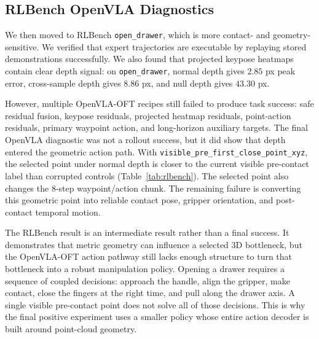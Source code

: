 \documentclass[conference]{IEEEtran}
\begin{document}
\subsection{RLBench OpenVLA Diagnostics}

We then moved to RLBench \texttt{open\_drawer}, which is more contact- and geometry-sensitive. We verified that expert trajectories are executable by replaying stored demonstrations successfully. We also found that projected keypose heatmaps contain clear depth signal: on \texttt{open\_drawer}, normal depth gives $2.85$ px peak error, cross-sample depth gives $8.86$ px, and null depth gives $43.30$ px.

However, multiple OpenVLA-OFT recipes still failed to produce task success: safe residual fusion, keypose residuals, projected heatmap residuals, point-action residuals, primary waypoint action, and long-horizon auxiliary targets. The final OpenVLA diagnostic was not a rollout success, but it did show that depth entered the geometric action path. With \texttt{visible\_pre\_first\_close\_point\_xyz}, the selected point under normal depth is closer to the current visible pre-contact label than corrupted controls (Table~\ref{tab:rlbench}). The selected point also changes the 8-step waypoint/action chunk. The remaining failure is converting this geometric point into reliable contact pose, gripper orientation, and post-contact temporal motion.

\begin{table}[t]
\centering
\caption{RLBench \texttt{open\_drawer} visible pre-contact diagnostic. Lower selected-point error is better.}
\label{tab:rlbench}
\end{table}

The RLBench result is an intermediate result rather than a final success. It demonstrates that metric geometry can influence a selected 3D bottleneck, but the OpenVLA-OFT action pathway still lacks enough structure to turn that bottleneck into a robust manipulation policy. Opening a drawer requires a sequence of coupled decisions: approach the handle, align the gripper, make contact, close the fingers at the right time, and pull along the drawer axis. A single visible pre-contact point does not solve all of those decisions. This is why the final positive experiment uses a smaller policy whose entire action decoder is built around point-cloud geometry.
\end{document}
